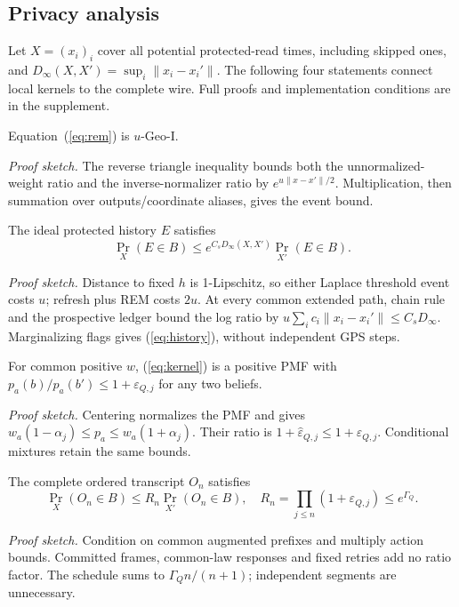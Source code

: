 \subsection{Privacy analysis}\label{sec:privacy}
Let $X=(x_i)_i$ cover all potential protected-read times, including skipped
ones, and $D_\infty(X,X')=\sup_i\|x_i-x_i'\|$.
The following four statements connect local kernels to the complete wire.
Full proofs and implementation conditions are in the supplement.

\begin{proposition}\label{prop:rem}
Equation~(\ref{eq:rem}) is $u$-Geo-I.
\end{proposition}
\noindent\emph{Proof sketch.}
The reverse triangle inequality bounds both the unnormalized-weight ratio and
the inverse-normalizer ratio by $e^{u\|x-x'\|/2}$.
Multiplication, then summation over outputs/coordinate aliases, gives the event bound.

\begin{proposition}\label{prop:history}
The ideal protected history $E$ satisfies
\begin{equation}
\Pr_X(E\in B)\le e^{C_sD_\infty(X,X')}\Pr_{X'}(E\in B). \label{eq:history}
\end{equation}
\end{proposition}
\noindent\emph{Proof sketch.}
Distance to fixed $h$ is 1-Lipschitz, so either Laplace threshold event
costs $u$; refresh plus REM costs $2u$.
At every common extended path, chain rule and the prospective ledger bound
the log ratio by $u\sum_i c_i\|x_i-x_i'\|\le C_sD_\infty$.
Marginalizing flags gives (\ref{eq:history}), without independent GPS steps.

\begin{proposition}\label{prop:kernel}
For common positive $w$, (\ref{eq:kernel}) is a positive PMF with
$p_a(b)/p_a(b')\le1+\varepsilon_{Q,j}$ for any two beliefs.
\end{proposition}
\noindent\emph{Proof sketch.}
Centering normalizes the PMF and gives
$w_a(1-\alpha_j)\le p_a\le w_a(1+\alpha_j)$.
Their ratio is $1+\widehat\varepsilon_{Q,j}\le1+\varepsilon_{Q,j}$.
Conditional mixtures retain the same bounds.

\begin{proposition}\label{prop:segments}
The complete ordered transcript $O_n$ satisfies
\begin{equation}
\Pr_X(O_n\in B)\le R_n\Pr_{X'}(O_n\in B),\quad
R_n=\prod_{j\le n}(1+\varepsilon_{Q,j})\le e^{\Gamma_Q}. \label{eq:segments}
\end{equation}
\end{proposition}
\noindent\emph{Proof sketch.}
Condition on common augmented prefixes and multiply action bounds.
Committed frames, common-law responses and fixed retries add no ratio factor.
The schedule sums to $\Gamma_Qn/(n+1)$; independent segments are unnecessary.

